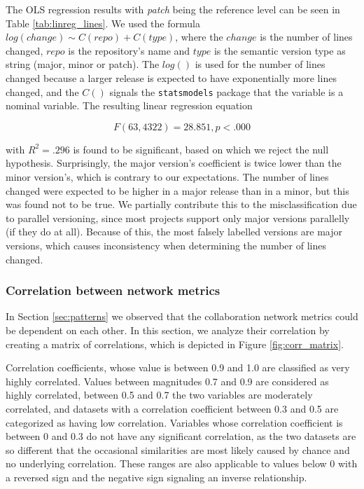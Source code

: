 The OLS regression results with \textit{patch} being the reference level can be seen in Table \ref{tab:linreg_lines}. We used the formula $ log(change) \sim C(repo) + C(type) $, where the $change$ is the number of lines changed, $repo$ is the repository's name and $type$ is the semantic version type as string (major, minor or patch). The $log()$ is used for the number of lines changed because a larger release is expected to have exponentially more lines changed, and the $C()$ signals the \texttt{statsmodels} package that the variable is a nominal variable. The resulting linear regression equation 

\[ F(63,4322) = 28.851, p < .000 \]

with $R^2 = .296$ is found to be significant, based on which we reject the null hypothesis. Surprisingly, the major version's coefficient is twice lower than the minor version's, which is contrary to our expectations. The number of lines changed were expected to be higher in a major release than in a minor, but this was found not to be true. We partially contribute this to the misclassification due to parallel versioning, since most projects support only major versions parallelly (if they do at all). Because of this, the most falsely labelled versions are major versions, which causes inconsistency when determining the number of lines changed.



\subsubsection{Correlation between network metrics}
In Section \ref{sec:patterns} we observed that the collaboration network metrics could be dependent on each other. In this section, we analyze their correlation by creating a matrix of correlations, which is depicted in Figure \ref{fig:corr_matrix}.

Correlation coefficients, whose value is between 0.9 and 1.0 are classified as very highly correlated. Values between magnitudes 0.7 and 0.9 are considered as highly correlated, between 0.5 and 0.7 the two variables are moderately correlated, and datasets with a correlation coefficient between 0.3 and 0.5 are categorized as having low correlation. Variables whose correlation coefficient is between 0 and 0.3 do not have any significant correlation, as the two datasets are so different that the occasional similarities are most likely caused by chance and no underlying correlation. These ranges are also applicable to values below 0 with a reversed sign and the negative sign signaling an inverse relationship.

